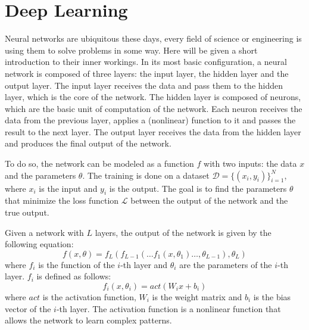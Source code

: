 \section{Deep Learning}
\label{sec:neural_network}

Neural networks are ubiquitous these days, every field of science or engineering is using them to solve problems in some way. Here will be given a short introduction to their inner workings. 
In its most basic configuration, a neural network is composed of three layers: the input layer, the hidden layer and the output layer. The input layer receives the data and pass them to the hidden layer, which is the core of the network. The hidden layer is composed of neurons, which are the basic unit of computation of the network. Each neuron receives the data from the previous layer, applies a (nonlinear) function to it and passes the result to the next layer. The output layer receives the data from the hidden layer and produces the final output of the network. 

To do so, the network can be modeled as a function $f$ with two inputs: the data $x$ and the parameters $\theta$. The training is done on a dataset \(\mathcal{D} = \{(x_i, y_i)\}_{i=1}^N\), where \(x_i\) is the input and \(y_i\) is the output. The goal is to find the parameters \(\theta\) that minimize the loss function \(\mathcal{L}\) between the output of the network and the true output. 

Given a network with \(L\) layers, the output of the network is given by the following equation:
\begin{equation}
    f(x, \theta) = f_L(f_{L-1}(\ldots f_1(x, \theta_1) \ldots, \theta_{L-1}), \theta_L)
\end{equation}
where \(f_i\) is the function of the \(i\)-th layer and \(\theta_i\) are the parameters of the \(i\)-th layer. \(f_i\) is defined as follows:
\begin{equation}
    f_i(x, \theta_i) = act(W_i x + b_i)
\end{equation}
where \(act\) is the activation function, \(W_i\) is the weight matrix and \(b_i\) is the bias vector of the \(i\)-th layer. The activation function is a nonlinear function that allows the network to learn complex patterns. 